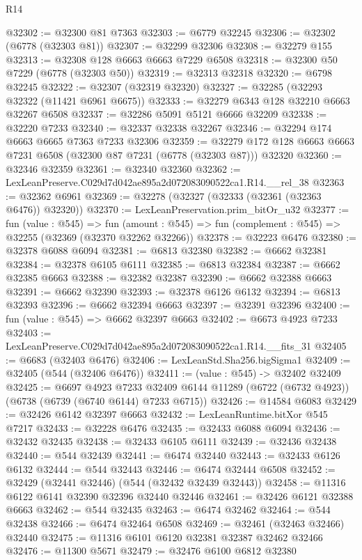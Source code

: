 \begin{lexlean}{R14}
\begin{coremodule}
@32302 := @32300 @81 @7363
@32303 := @6779 @32245
@32306 := @32302 (@6778 (@32303 @81))
@32307 := @32299 @32306
@32308 := @32279 @155
@32313 := @32308 @128 @6663 @6663 @7229 @6508
@32318 := @32300 @50 @7229 (@6778 (@32303 @50))
@32319 := @32313 @32318
@32320 := @6798 @32245
@32322 := @32307 (@32319 @32320)
@32327 := @32285 (@32293 @32322 (@11421 @6961 @6675))
@32333 := @32279 @6343 @128 @32210 @6663 @32267 @6508
@32337 := @32286 @5091 @5121 @6666 @32209
@32338 := @32220 @7233
@32340 := @32337 @32338 @32267
@32346 := @32294 @174 @6663 @6665 @7363 @7233 @32306
@32359 := @32279 @172 @128 @6663 @6663 @7231 @6508 (@32300 @87 @7231 (@6778 (@32303 @87))) @32320
@32360 := @32346 @32359
@32361 := @32340 @32360
@32362 := LexLeanPreserve.C029d7d042ae895a2d072083090522ca1.R14.__rel_38
@32363 := @32362 @6961
@32369 := @32278 (@32327 (@32333 (@32361 (@32363 @6476)) @32320))
@32370 := LexLeanPreservation.prim_bitOr_u32
@32377 := fun (value : @545) =>
  fun (amount : @545) => fun (complement : @545) => @32255 (@32369 (@32370 @32262 @32266))
@32378 := @32223 @6476
@32380 := @32378 @6088 @6094
@32381 := @6813 @32380
@32382 := @6662 @32381
@32384 := @32378 @6105 @6111
@32385 := @6813 @32384
@32387 := @6662 @32385 @6663
@32388 := @32382 @32387
@32390 := @6662 @32388 @6663
@32391 := @6662 @32390
@32393 := @32378 @6126 @6132
@32394 := @6813 @32393
@32396 := @6662 @32394 @6663
@32397 := @32391 @32396
@32400 := fun (value : @545) => @6662 @32397 @6663
@32402 := @6673 @4923 @7233
@32403 := LexLeanPreserve.C029d7d042ae895a2d072083090522ca1.R14.__fits_31
@32405 := @6683 (@32403 @6476)
@32406 := LexLeanStd.Sha256.bigSigma1
@32409 := @32405 (@544 (@32406 @6476))
@32411 := (value : @545) -> @32402 @32409
@32425 := @6697
    @4923
    @7233
    @32409
    @6144
    @11289
    (@6722 (@6732 @4923))
    (@6738 (@6739 (@6740 @6144) @7233 @6715))
@32426 := @14584 @6083
@32429 := @32426 @6142 @32397 @6663
@32432 := LexLeanRuntime.bitXor @545 @7217
@32433 := @32228 @6476
@32435 := @32433 @6088 @6094
@32436 := @32432 @32435
@32438 := @32433 @6105 @6111
@32439 := @32436 @32438
@32440 := @544 @32439
@32441 := @6474 @32440
@32443 := @32433 @6126 @6132
@32444 := @544 @32443
@32446 := @6474 @32444 @6508
@32452 := @32429 (@32441 @32446) (@544 (@32432 @32439 @32443))
@32458 := @11316 @6122 @6141 @32390 @32396 @32440 @32446
@32461 := @32426 @6121 @32388 @6663
@32462 := @544 @32435
@32463 := @6474 @32462
@32464 := @544 @32438
@32466 := @6474 @32464 @6508
@32469 := @32461 (@32463 @32466) @32440
@32475 := @11316 @6101 @6120 @32381 @32387 @32462 @32466
@32476 := @11300 @5671
@32479 := @32476 @6100 @6812 @32380

\end{coremodule}
\end{lexlean}
